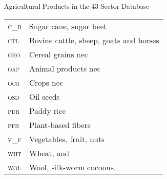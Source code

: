 \documentclass[10pt]{beamer}
\begin{document}
\begin{frame}{Agricultural Products in the 43 Sector Database}


\vspace{5pt}
\begin{tabular}{ll}
\textsc{c\_b}&Sugar cane, sugar beet\\
\textsc{ctl}&Bovine cattle, sheep, goats and horses\\
\textsc{gro}&Cereal grains nec\\
\textsc{oap}&Animal products nec\\
\textsc{ocr}&Crops nec\\
\textsc{osd}&Oil seeds\\
\textsc{pdr}&Paddy rice\\
\textsc{pfb}&Plant-based fibers\\
\textsc{v\_f}&Vegetables, fruit, nuts\\
\textsc{wht}&Wheat, and\\
\textsc{wol}&Wool, silk-worm cocoons.\\
\end{tabular}
\vspace{5pt}

\end{frame}
\end{document}
